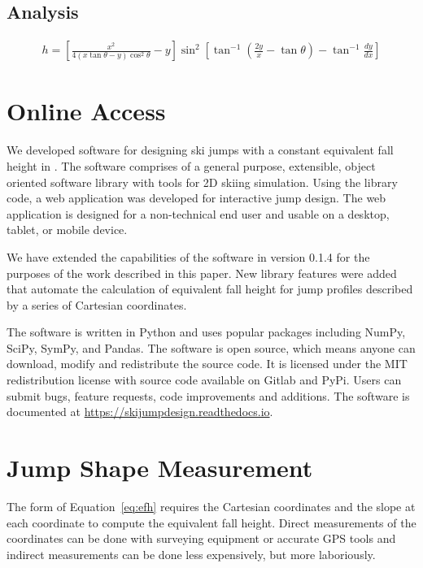 \documentclass{article}
\begin{document}
\subsection{Analysis}

\begin{align}
  h = \left[\frac{x^2}{4(x\tan\theta - y)\cos^{2}\theta} -
    y\right]\sin^{2}\left[\tan^{-1}(\frac{2y}{x}- \tan\theta)- \tan^{-1}\frac{dy}{dx}\right]
  \label{eq:efh}
\end{align}

\section{Online Access}
%
We developed software for designing ski jumps with a constant equivalent fall
height in \cite{Moore2018}. The software comprises of a general purpose,
extensible, object oriented software library with tools for 2D skiing
simulation. Using the library code, a web application was developed for
interactive jump design. The web application is designed for a non-technical
end user and usable on a desktop, tablet, or mobile device.

We have extended the capabilities of the software in version 0.1.4 for the
purposes of the work described in this paper. New library features were added
that automate the calculation of equivalent fall height for jump profiles
described by a series of Cartesian coordinates.

The software is written in Python and uses popular packages including NumPy,
SciPy, SymPy, and Pandas.  The software is open source, which means anyone can
download, modify and redistribute the source code. It is licensed under the MIT
redistribution license with source code available on Gitlab and PyPi. Users can
submit bugs, feature requests, code improvements and additions.  The software
is documented at
\href{https://skijumpdesign.readthedocs.io}{https://skijumpdesign.readthedocs.io}.

\section{Jump Shape Measurement}
%
The form of Equation~\ref{eq:efh} requires the Cartesian coordinates and the
slope at each coordinate to compute the equivalent fall height. Direct
measurements of the coordinates can be done with surveying equipment or
accurate GPS tools and indirect measurements can be done less expensively, but
more laboriously.
\end{document}
